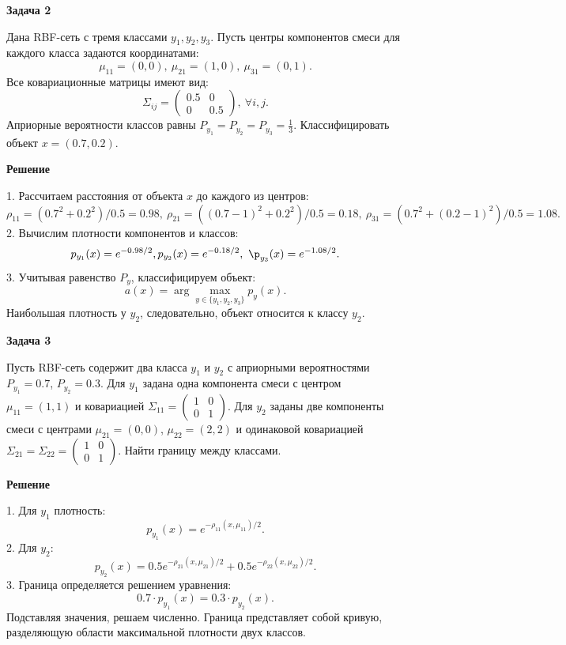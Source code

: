 \textbf{Задача 2}

Дана RBF-сеть с тремя классами $ y_1, y_2, y_3 $. Пусть центры компонентов смеси для каждого класса задаются координатами:
\[
\mu_{11} = (0, 0), \ \mu_{21} = (1, 0), \ \mu_{31} = (0, 1).
\]
Все ковариационные матрицы имеют вид:
\[
\Sigma_{ij} = \begin{pmatrix} 0.5 & 0 \\
0 & 0.5 \end{pmatrix}, \ \forall i, j.
\]
Априорные вероятности классов равны $ P_{y_1} = P_{y_2} = P_{y_3} = \frac{1}{3} $. Классифицировать объект $ x = (0.7, 0.2) $.

\textbf{Решение}

1. Рассчитаем расстояния от объекта $ x $ до каждого из центров:
\[
\rho_{11} = (0.7^2 + 0.2^2)/0.5 = 0.98, \ \rho_{21} = ((0.7 - 1)^2 + 0.2^2)/0.5 = 0.18, \ \rho_{31} = (0.7^2 + (0.2 - 1)^2)/0.5 = 1.08.
\]
2. Вычислим плотности компонентов и классов:
\[
p_{y_1}(x) = e^{-0.98/2}, \\p_{y_2}(x) = e^{-0.18/2}, \ \p_{y_3}(x) = e^{-1.08/2}.
\]
3. Учитывая равенство $ P_y $, классифицируем объект:
\[
a(x) = \arg\max_{y \in \{y_1, y_2, y_3\}} p_y(x).
\]
Наибольшая плотность у $ y_2 $, следовательно, объект относится к классу $ y_2 $.

\textbf{Задача 3}

Пусть RBF-сеть содержит два класса $ y_1 $ и $ y_2 $ с априорными вероятностями $ P_{y_1} = 0.7 $, $ P_{y_2} = 0.3 $. Для $ y_1 $ задана одна компонента смеси с центром $ \mu_{11} = (1, 1) $ и ковариацией $ \Sigma_{11} = \begin{pmatrix} 1 & 0 \\
0 & 1 \end{pmatrix} $. Для $ y_2 $ заданы две компоненты смеси с центрами $ \mu_{21} = (0, 0) $, $ \mu_{22} = (2, 2) $ и одинаковой ковариацией $ \Sigma_{21} = \Sigma_{22} = \begin{pmatrix} 1 & 0 \\
0 & 1 \end{pmatrix} $. Найти границу между классами.

\textbf{Решение}

1. Для $ y_1 $ плотность:
\[
p_{y_1}(x) = e^{-\rho_{11}(x, \mu_{11})/2}.
\]
2. Для $ y_2 $:
\[
p_{y_2}(x) = 0.5 e^{-\rho_{21}(x, \mu_{21})/2} + 0.5 e^{-\rho_{22}(x, \mu_{22})/2}.
\]
3. Граница определяется решением уравнения:
\[
0.7 \cdot p_{y_1}(x) = 0.3 \cdot p_{y_2}(x).
\]
Подставляя значения, решаем численно. Граница представляет собой кривую, разделяющую области максимальной плотности двух классов.


